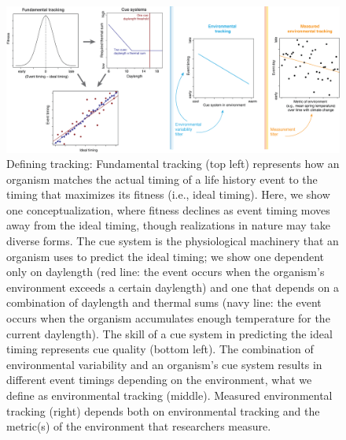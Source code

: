 \documentclass[11pt,letterpaper]{article}
\begin{document}
\begin{figure}[h!]
\centering
\includegraphics[width=1\textwidth]{..//..//..//R/graphs/conceptual/envtracking_define.png}
\caption{Defining tracking: Fundamental tracking (top left) represents how an organism matches the actual timing of a life history event to the timing that maximizes its fitness (i.e., ideal timing). Here, we show one conceptualization, where fitness declines as event timing moves away from the ideal timing, though realizations in nature may take diverse forms. The cue system is the physiological machinery that an organism uses to predict the ideal timing; we show one dependent only on daylength (red line: the event occurs when the organism's environment exceeds a certain daylength) and one that depends on a combination of daylength and thermal sums (navy line: the event occurs when the organism accumulates enough temperature for the current daylength). The skill of a cue system in predicting the ideal timing represents cue quality (bottom left). The combination of  environmental variability and an organism's cue system results in different event timings depending on the environment, what we define as environmental tracking (middle). Measured environmental tracking (right) depends both on environmental tracking and the metric(s) of the environment that researchers measure. } 
 \label{fig:defineET}
\end{figure}
\end{document}

